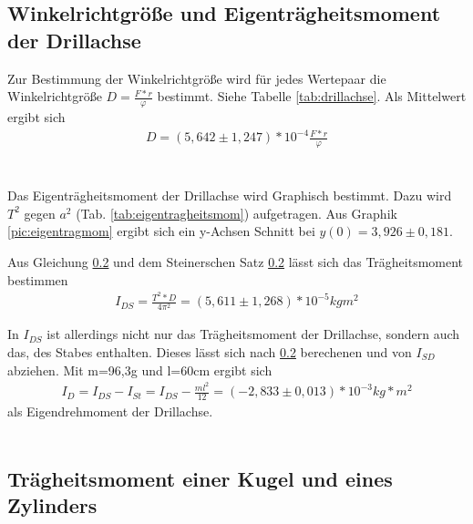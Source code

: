 \subsection{Winkelrichtgröße und Eigenträgheitsmoment der Drillachse}

Zur Bestimmung der Winkelrichtgröße wird für jedes Wertepaar die Winkelrichtgröße $D=\frac{F*r}{\varphi}$ bestimmt. Siehe Tabelle \ref{tab:drillachse}. Als Mittelwert ergibt sich
\begin{align*}
D=(5,642\pm1,247)*10^{-4}\frac{F*r}{\varphi}
\end{align*}
\\
\\


Das Eigenträgheitsmoment der Drillachse wird Graphisch bestimmt. Dazu wird $T^2$ gegen $a^2$ (Tab. \ref{tab:eigentragheitsmom}) aufgetragen. 
Aus Graphik \ref{pic:eigentragmom} ergibt sich ein y-Achsen Schnitt bei $y(0)=3,926\pm0,181$.


Aus Gleichung \ref{} und dem Steinerschen Satz \ref{} lässt sich das Trägheitsmoment bestimmen
\begin{align}
I_{DS}=\frac{T^2*D}{4\pi^2}=(5,611\pm1,268)*10^{-5}kgm^2
\end{align}

In $I_{DS}$ ist allerdings nicht nur das Trägheitsmoment der Drillachse, sondern auch das, des Stabes enthalten. Dieses lässt sich nach \ref{} berechenen und von $I_{SD}$ abziehen. Mit m=96,3g und l=60cm ergibt sich
\begin{align}
I_{D}=I_{DS}-I_{St}=I_{DS}-\frac{ml^2}{12}=(-2,833\pm0,013)*10^{-3}kg*m^2
\end{align}
als Eigendrehmoment der Drillachse.
\\
\\
\subsection{Trägheitsmoment einer Kugel und eines Zylinders}


